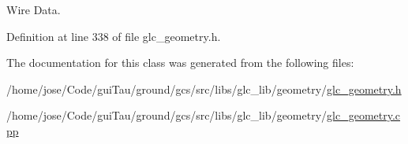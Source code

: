Wire Data. 



Definition at line 338 of file glc\-\_\-geometry.\-h.



The documentation for this class was generated from the following files\-:\begin{DoxyCompactItemize}
\item 
/home/jose/\-Code/gui\-Tau/ground/gcs/src/libs/glc\-\_\-lib/geometry/\hyperlink{glc__geometry_8h}{glc\-\_\-geometry.\-h}\item 
/home/jose/\-Code/gui\-Tau/ground/gcs/src/libs/glc\-\_\-lib/geometry/\hyperlink{glc__geometry_8cpp}{glc\-\_\-geometry.\-cpp}\end{DoxyCompactItemize}
